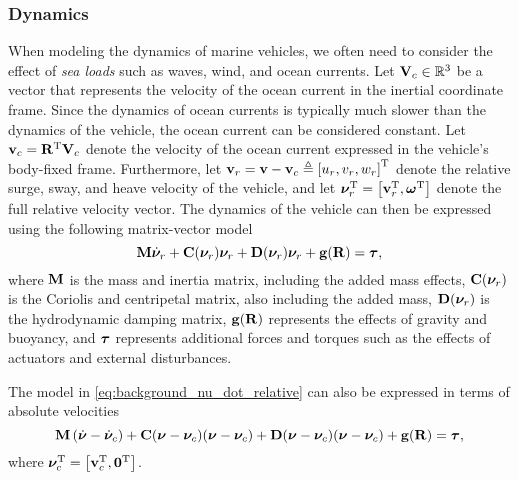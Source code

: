\subsubsection*{Dynamics}
When modeling the dynamics of marine vehicles, we often need to consider the effect of \emph{sea loads} such as waves, wind, and ocean currents.
Let $\mathbf{V}_c \in \mathbb{R}^3$ be a vector that represents the velocity of the ocean current in the inertial coordinate frame.
Since the dynamics of ocean currents is typically much slower than the dynamics of the vehicle, the ocean current can be considered constant.
Let $\mathbf{v}_c = \mathbf{R}^{\mathrm{T}} \mathbf{V}_c$ denote the velocity of the ocean current expressed in the vehicle's body-fixed frame.
Furthermore, let $\mathbf{v}_r = \mathbf{v} - \mathbf{v}_c \triangleq \left[u_r, v_r, w_r\right]^{\mathrm{T}}$ denote the relative surge, sway, and heave velocity of the vehicle, and let $\bm{\nu}_r^{\mathrm{T}} = \left[\mathbf{v}_r^{\mathrm{T}}, \bm{\omega}^{\mathrm{T}}\right]$ denote the full relative velocity vector.
The dynamics of the vehicle can then be expressed using the following matrix-vector model \cite{fossen_handbook_2011}
\begin{equation}
    \mathbf{M} \dot{\bm{\nu}}_r + \mathbf{C}(\bm{\nu}_r)\bm{\nu}_r + \mathbf{D}(\bm{\nu}_r)\bm{\nu}_r + \mathbf{g}(\mathbf{R}) = \bm{\tau},
    \label{eq:background_nu_dot_relative}
\end{equation}
where $\mathbf{M}$ is the mass and inertia matrix, including the added mass effects, $\mathbf{C}(\bm{\nu}_r)$ is the Coriolis and centripetal matrix, also including the added mass, $\mathbf{D}(\bm{\nu}_r)$ is the hydrodynamic damping matrix, $\mathbf{g}(\mathbf{R})$ represents the effects of gravity and buoyancy, and $\bm{\tau}$ represents additional forces and torques such as the effects of actuators and external disturbances.

The model in \eqref{eq:background_nu_dot_relative} can also be expressed in terms of absolute velocities
\begin{equation}
    \mathbf{M} \left(\dot{\bm{\nu}} - \dot{\bm{\nu}}_c\right) + \mathbf{C}(\bm{\nu} - \bm{\nu}_c)(\bm{\nu} - \bm{\nu}_c) + \mathbf{D}(\bm{\nu} - \bm{\nu}_c)(\bm{\nu} - \bm{\nu}_c) + \mathbf{g}(\mathbf{R}) = \bm{\tau},
\end{equation}
where $\bm{\nu}_c^{\mathrm{T}} = \left[\mathbf{v}_c^{\mathrm{T}}, \mathbf{0}^{\mathrm{T}}\right]$.

